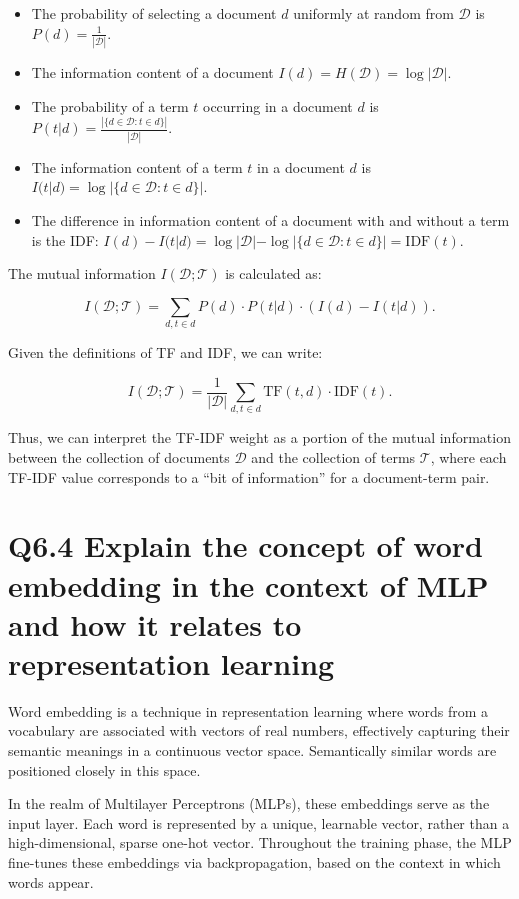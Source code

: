 \documentclass[11pt]{article}
\begin{document}
\begin{itemize}
  \item The probability of selecting a document $d$ uniformly at random from $\mathcal{D}$ is $P(d) = \frac{1}{|\mathcal{D}|}$.
  \item The information content of a document $I(d) = H(\mathcal{D}) = \log |\mathcal{D}|$.
  \item The probability of a term $t$ occurring in a document $d$ is $P(t|d) = \frac{|\{d \in \mathcal{D} : t \in d\}|}{|\mathcal{D}|}$.
  \item The information content of a term $t$ in a document $d$ is $I(t|d) = \log |\{d \in \mathcal{D} : t \in d\}|$.
  \item The difference in information content of a document with and without a term is the IDF: $I(d) - I(t|d) = \log |\mathcal{D}| - \log |\{d \in \mathcal{D} : t \in d\}| = \text{IDF}(t)$.
\end{itemize}

The mutual information $I(\mathcal{D}; \mathcal{T})$ is calculated as:

\[
I(\mathcal{D}; \mathcal{T}) = \sum_{d, t \in d} P(d) \cdot P(t|d) \cdot (I(d) - I(t|d)).
\]

Given the definitions of TF and IDF, we can write:

\[
I(\mathcal{D}; \mathcal{T}) = \frac{1}{|\mathcal{D}|} \sum_{d, t \in d} \text{TF}(t, d) \cdot \text{IDF}(t).
\]

Thus, we can interpret the TF-IDF weight as a portion of the mutual information between the collection of documents $\mathcal{D}$ and the collection of terms $\mathcal{T}$, where each TF-IDF value corresponds to a “bit of information” for a document-term pair.

\section{Q6.4 Explain the concept of word embedding in the context of MLP and how it relates to representation learning}

Word embedding is a technique in representation learning where words from a vocabulary are associated with vectors of real numbers, effectively capturing their semantic meanings in a continuous vector space. Semantically similar words are positioned closely in this space. 

In the realm of Multilayer Perceptrons (MLPs), these embeddings serve as the input layer. Each word is represented by a unique, learnable vector, rather than a high-dimensional, sparse one-hot vector. Throughout the training phase, the MLP fine-tunes these embeddings via backpropagation, based on the context in which words appear.
\end{document}
